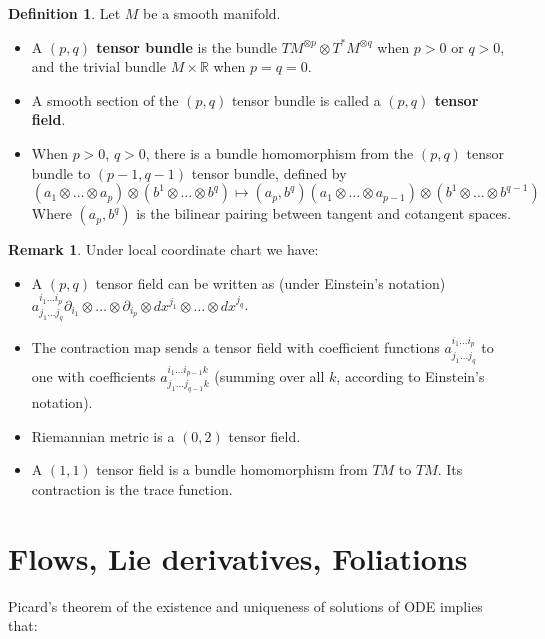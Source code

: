 \documentclass{article}
\theoremstyle{definition}
\newtheorem{dfn}[thm]{Definition}
\newtheorem{rmk}[thm]{Remark}
\begin{document}
\begin{dfn}
    Let $M$ be a smooth manifold.
    \begin{itemize}
        \item A {\bf $(p, q)$ tensor bundle} is the bundle $TM^{\otimes p}\otimes T^*M^{\otimes q}$ when $p>0$ or $q>0$, and the trivial bundle $M\times\mathbb{R}$ when $p=q=0$.
        \item A smooth section of the $(p, q)$ tensor bundle is called a {\bf $(p, q)$ tensor field}.
        \item When $p>0$, $q>0$, there is a bundle homomorphism from the $(p, q)$ tensor bundle to $(p-1, q-1)$ tensor bundle, defined by 
        \[(a_1\otimes\dots\otimes a_p)\otimes (b^1\otimes \dots \otimes b^q)\mapsto (a_p, b^q)(a_1\otimes \dots \otimes a_{p-1})\otimes (b^1\otimes \dots \otimes b^{q-1})\]
        Where $(a_p, b^q)$ is the bilinear pairing between tangent and cotangent spaces.
    \end{itemize}
\end{dfn}

\begin{rmk}
    Under local coordinate chart we have:
    \begin{itemize}
        \item A $(p, q)$ tensor field can be written as (under Einstein's notation) $a^{i_1\dots i_p}_{j_1\dots j_q}\partial_{i_1}\otimes\dots\otimes \partial_{i_p}\otimes dx^{j_1}\otimes \dots \otimes dx^{j_q}$.
        \item The contraction map sends a tensor field with coefficient functions $a^{i_1\dots i_p}_{j_1\dots j_q}$ to one with coefficients $a^{i_1\dots i_{p-1}k}_{j_1\dots j_{q-1}k}$ (summing over all $k$, according to Einstein's notation).
        \item Riemannian metric is a $(0, 2)$ tensor field.
        \item A $(1, 1)$ tensor field is a bundle homomorphism from $TM$ to $TM$. Its contraction is the trace function.
    \end{itemize}
\end{rmk}


\newpage

\section{Flows, Lie derivatives, Foliations}

Picard's theorem of the existence and uniqueness of solutions of ODE implies that:
\end{document}
